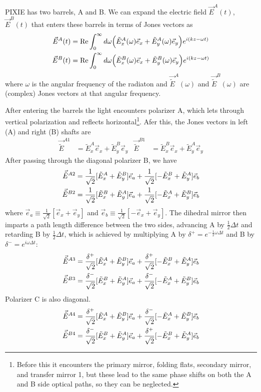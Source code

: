 \documentclass{article}
\newcommand{\rtwo}{\frac{1}{\sqrt{2}}}
\newcommand{\rtd}{\frac{\delta^+}{\sqrt{2}}}
\newcommand{\rtc}{\frac{\delta^-}{\sqrt{2}}}
\newcommand{\J}{{\tilde E}}
\renewcommand{\Re}{\operatorname{Re}}
\begin{document}
PIXIE has two barrels, A and B. We can expand the electric field $\vec E^A(t)$,
$\vec E^B(t)$ that enters these barrels in terms of Jones vectors as
\begin{align}
	\vec E^A(t) &= \Re \int_0^\infty d\omega \Big(\J^A_x(\omega)\vec e_x +
		\J^A_y(\omega)\vec e_y\Big) e^{i(kz-\omega t)} \notag \\
	\vec E^B(t) &= \Re \int_0^\infty d\omega \Big(\J^B_x(\omega)\vec e_x +
		\J^B_y(\omega)\vec e_y\Big) e^{i(kz-\omega t)}
\end{align}
where $\omega$ is the angular frequency of the radiaton and $\vec \J^A(\omega)$
and $\vec \J^B(\omega)$ are (complex) Jones vectors at that
angular frequency.

After entering the barrels the light encounters polarizer A, which lets through
vertical polarization and reflects horizontal\footnote{
	Before this it encounters the primary mirror, folding flats, secondary mirror,
	and transfer mirror 1, but these lead to the same phase shifts on both
	the A and B side optical paths, so they can be neglected.}. Afer this,
the Jones vectors in left (A) and right (B) shafts are
\begin{align}
	\vec \J^{A1} &= \J^A_x \vec e_x + \J^B_y \vec e_y &
	\vec \J^{B1} &= \J^B_x \vec e_x + \J^A_y \vec e_y
\end{align}
After passing through the diagonal polarizer B, we have
\begin{align}
	\vec \J^{A2} &= \rtwo [\J^A_x+\J^B_y]\vec e_a + \rtwo[-\J^B_x+\J^A_y]\vec e_b \notag \\
	\vec \J^{B2} &= \rtwo [\J^B_x+\J^A_y]\vec e_a + \rtwo[-\J^A_x+\J^B_y]\vec e_b
\end{align}
where $\vec e_a \equiv \rtwo [\vec e_x + \vec e_y]$ and $\vec e_b
\equiv \rtwo [-\vec e_x + \vec e_y]$. The dihedral mirror then
imparts a path length difference between the two sides, advancing
A by $\frac12\Delta t$ and retarding B by $\frac12\Delta t$, which
is achieved by multiplying A by $\delta^+ = e^{-\frac12\omega\Delta t}$
and B by $\delta^- = e^{i\omega\Delta t}$:
\begin{align}
	\vec \J^{A3} &= \rtd [\J^A_x+\J^B_y]\vec e_a + \rtd[-\J^B_x+\J^A_y]\vec e_b \notag \\
	\vec \J^{B3} &= \rtc [\J^B_x+\J^A_y]\vec e_a + \rtc[-\J^A_x+\J^B_y]\vec e_b
\end{align}
Polarizer C is also diagonal.
\begin{align}
	\vec \J^{A4} &= \rtd [\J^A_x+\J^B_y]\vec e_a + \rtc [-\J^A_x+\J^B_y]\vec e_b \notag \\
	\vec \J^{B4} &= \rtc [\J^B_x+\J^A_y]\vec e_a + \rtd [-\J^B_x+\J^A_y]\vec e_b
\end{align}
\end{document}
